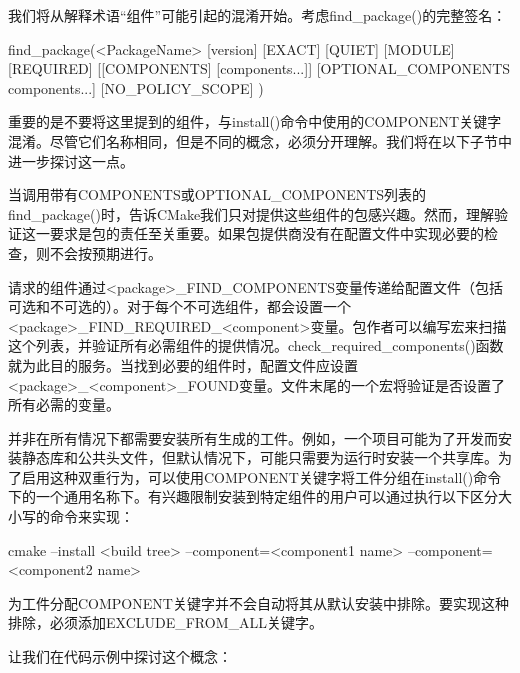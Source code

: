 
我们将从解释术语“组件”可能引起的混淆开始。考虑find\_package()的完整签名：

\begin{shell}
find_package(<PackageName>
            [version] [EXACT] [QUIET] [MODULE] [REQUIRED]
            [[COMPONENTS] [components...]]
            [OPTIONAL_COMPONENTS components...]
            [NO_POLICY_SCOPE]
)
\end{shell}

重要的是不要将这里提到的组件，与install()命令中使用的COMPONENT关键字混淆。尽管它们名称相同，但是不同的概念，必须分开理解。我们将在以下子节中进一步探讨这一点。


当调用带有COMPONENTS或OPTIONAL\_COMPONENTS列表的find\_package()时，告诉CMake我们只对提供这些组件的包感兴趣。然而，理解验证这一要求是包的责任至关重要。如果包提供商没有在配置文件中实现必要的检查，则不会按预期进行。

请求的组件通过<package>\_FIND\_COMPONENTS变量传递给配置文件（包括可选和不可选的）。对于每个不可选组件，都会设置一个<package>\_FIND\_REQUIRED\_<component>变量。包作者可以编写宏来扫描这个列表，并验证所有必需组件的提供情况。check\_required\_components()函数就为此目的服务。当找到必要的组件时，配置文件应设置<package>\_<component>\_FOUND变量。文件末尾的一个宏将验证是否设置了所有必需的变量。


并非在所有情况下都需要安装所有生成的工件。例如，一个项目可能为了开发而安装静态库和公共头文件，但默认情况下，可能只需要为运行时安装一个共享库。为了启用这种双重行为，可以使用COMPONENT关键字将工件分组在install()命令下的一个通用名称下。有兴趣限制安装到特定组件的用户可以通过执行以下区分大小写的命令来实现：

\begin{shell}
cmake --install <build tree>
      --component=<component1 name> --component=<component2 name>
\end{shell}

为工件分配COMPONENT关键字并不会自动将其从默认安装中排除。要实现这种排除，必须添加EXCLUDE\_FROM\_ALL关键字。

让我们在代码示例中探讨这个概念：



